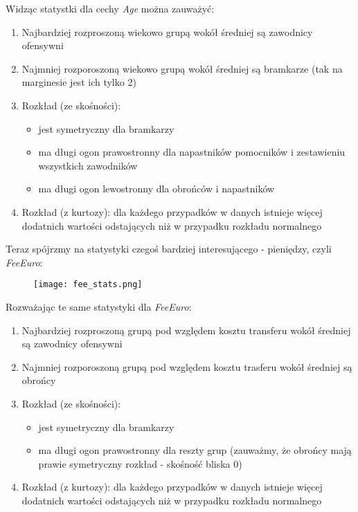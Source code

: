 \documentclass{article}
\begin{document}
Widząc statystki dla cechy \textit{Age} można zauważyć:
\begin{enumerate}
    \item Najbardziej rozproszoną wiekowo grupą wokół średniej są zawodnicy ofensywni
    \item Najmniej rozporoszoną wiekowo grupą wokół średniej są bramkarze (tak na marginesie jest ich tylko 2)
    \item Rozkład (ze skośności):
    \begin{itemize}
        \item jest symetryczny dla bramkarzy
        \item ma długi ogon prawostronny dla napastników pomocników i zestawieniu wszystkich zawodników
        \item ma długi ogon lewostronny dla obrońców i napastników
    \end{itemize}
    \item Rozkład (z kurtozy): dla każdego przypadków w danych istnieje więcej dodatnich wartości odstających niż w przypadku rozkładu normalnego
\end{enumerate}

Teraz spójrzmy na statystyki czegoś bardziej interesującego - pieniędzy, czyli \textit{Fee\textunderscore Euro}:

\begin{figure}[H]
    \centering
    \texttt{[image: fee\_stats.png]}
\end{figure}

Rozważając te same statystyki dla \textit{Fee\textunderscore Euro}:
\begin{enumerate}
    \item Najbardziej rozproszoną grupą pod względem kosztu transferu wokół średniej są zawodnicy ofensywni
    \item Najmniej rozporoszoną grupą pod względem kosztu trasferu wokół średniej są obrońcy
    \item Rozkład (ze skośności):
    \begin{itemize}
        \item jest symetryczny dla bramkarzy
        \item ma długi ogon prawostronny dla reszty grup (zauważmy, że obrońcy mają prawie symetryczny rozkład - skośność bliska 0)
    \end{itemize}
    \item Rozkład (z kurtozy): dla każdego przypadków w danych istnieje więcej dodatnich wartości odstających niż w przypadku rozkładu normalnego
\end{enumerate}
\end{document}
